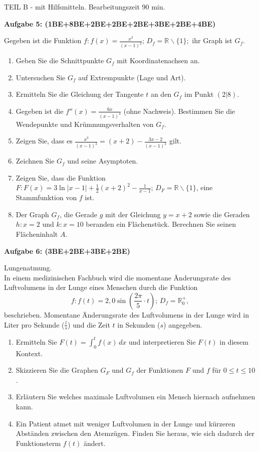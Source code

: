 \documentclass[a4paper,12pt]{article}
\newcommand{\Aufgabe}[1]{
  {
  \vspace*{0.5cm}
  \textsf{\textbf{Aufgabe #1}}
  \vspace*{0.2cm}
  
  }
}
\begin{document}
\newpage
\vspace{1,5cm} {TEIL B} - mit Hilfsmitteln. Bearbeitungszeit 90 min.
\vspace {0,2cm}

\Aufgabe{5: (1BE+8BE+2BE+2BE+2BE+3BE+2BE+4BE)} %
Gegeben ist die Funktion $f: f(x) = \frac{x^3}{(x-1)^2};\, D_f=\mathbb{R}\backslash\{1\};$ ihr Graph ist $G_f$.
\begin{enumerate}[label={\alph*)}]
  \item Geben Sie die Schnittpunkte $G_f$ mit Koordinatenachsen an.
  \item Untersuchen Sie $G_f$ auf Extrempunkte (Lage und Art).
  \item Ermitteln Sie die Gleichung der Tangente $t$ an den $G_f$ im Punkt $(2|8)$.
  \item Gegeben ist die $f''(x)=\frac{6x}{(x-1)^4}$ (ohne Nachweis). Bestimmen Sie die Wendepunkte und Krümmungsverhalten von $G_f$.
  \item Zeigen Sie, dass es $\frac{x^3}{(x-1)^2}=(x+2)-\frac{3x-2}{(x-1)^2}$ gilt.
  \item Zeichnen Sie $G_f$ und seine Asymptoten.
  \item Zeigen Sie, dass die Funktion $F: F(x) = 3 \ln |x-1| + \frac{1}{2}(x+2)^2 - \frac{1}{x-1};\, D_F=\mathbb{R}\backslash\{1\}$, eine Stammfunktion von $f$ ist.
  \item Der Graph $G_f$, die Gerade $g$ mit der Gleichung $y=x+2$ sowie die Geraden $h: x=2$ und $k: x=10$ beranden ein Flächenstück. Berechnen Sie seinen Flächeninhalt $A$.
\end{enumerate}

\Aufgabe{6: (3BE+2BE+3BE+2BE)}
Lungenatmung.\\
In einem medizinischen Fachbuch wird die momentane Änderungsrate des Luftvolumens in der Lunge eines Menschen durch die Funktion
\[f:f(t) = 2,0 \sin (\frac{2\pi}{5}\cdot t);\, D_f=\mathbb{R}_0^+,\] beschrieben.
Momentane Änderungsrate des Luftvolumens in der Lunge wird in Liter pro Sekunde ($\frac{l}{s}$) und die Zeit $t$ in Sekunden ($s$) angegeben.
\begin{enumerate}[label={\alph*)}]
  \item Ermitteln Sie $F(t)=\int_0^t f(x)\, dx$ und interpretieren Sie $F(t)$ in diesem Kontext.
  \item Skizzieren Sie die Graphen $G_F$ und $G_f$ der Funktionen $F$ und $f$ für $0 \le t \le 10$.
  \item Erläutern Sie welches maximale Luftvolumen ein Mensch hiernach aufnehmen kann.
  \item Ein Patient atmet mit weniger Luftvolumen in der Lunge und kürzeren Abständen zwischen den Atemzügen. Finden Sie heraus, wie sich dadurch der Funktionsterm $f(t)$ ändert.
\end{enumerate}
\end{document}
